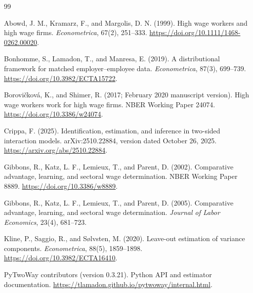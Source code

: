 \documentclass[11pt]{article}
\begin{document}
\clearpage
{\small
\begin{thebibliography}{99}
\setlength{\itemsep}{0.15em}

Abowd, J. M., Kramarz, F., and Margolis, D. N. (1999).
High wage workers and high wage firms.
\emph{Econometrica}, 67(2), 251--333.
\url{https://doi.org/10.1111/1468-0262.00020}.

Bonhomme, S., Lamadon, T., and Manresa, E. (2019).
A distributional framework for matched employer--employee data.
\emph{Econometrica}, 87(3), 699--739.
\url{https://doi.org/10.3982/ECTA15722}.

Borovi\v{c}kov\'{a}, K., and Shimer, R. (2017; February 2020 manuscript version).
High wage workers work for high wage firms.
NBER Working Paper 24074.
\url{https://doi.org/10.3386/w24074}.

Crippa, F. (2025).
Identification, estimation, and inference in two-sided interaction models.
arXiv:2510.22884, version dated October 26, 2025.
\url{https://arxiv.org/abs/2510.22884}.

Gibbons, R., Katz, L. F., Lemieux, T., and Parent, D. (2002).
Comparative advantage, learning, and sectoral wage determination.
NBER Working Paper 8889.
\url{https://doi.org/10.3386/w8889}.

Gibbons, R., Katz, L. F., Lemieux, T., and Parent, D. (2005).
Comparative advantage, learning, and sectoral wage determination.
\emph{Journal of Labor Economics}, 23(4), 681--723.

Kline, P., Saggio, R., and S\o lvsten, M. (2020).
Leave-out estimation of variance components.
\emph{Econometrica}, 88(5), 1859--1898.
\url{https://doi.org/10.3982/ECTA16410}.

PyTwoWay contributors (version 0.3.21).
Python API and estimator documentation.
\url{https://tlamadon.github.io/pytwoway/internal.html}.

\end{thebibliography}
}
\end{document}
